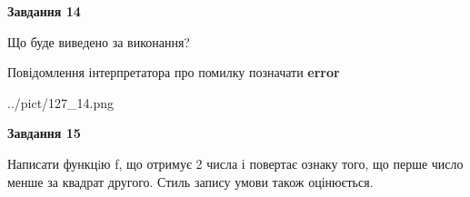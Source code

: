 \documentclass[11pt, ukrainian]{article}
\begin{document}
{\begin {large}
{\begin {center}\textbf{Завдання 14}\end {center}}\par
Що буде виведено за виконання? \par
Повідомлення інтерпретатора про помилку позначати \textbf{error}

\begin{center}
	{../pict/127_14.png}
\end{center}
\newpage

{\begin {center}\textbf{Завдання 15}\end {center}}\par

Написати функцiю f, що отримує 2 числа і повертає ознаку того, що перше число менше за квадрат другого. Стиль запису умови також оцінюється.\par
\newpage

\end {large}}
\end{document}
